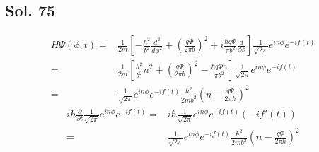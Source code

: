  \subsection*{Sol. 75}
 \begin{align*}
     H\Psi(\phi,t)
    =& \frac{1}{2m}
    \left[
    -\frac{\hbar^2}{b^2}\frac{d^2}{d\phi^2}
    +\left(
    \frac{q\Phi}{2\pi b}
    \right)^2
    +
    i\frac{\hbar q\Phi}{\pi b^2}
    \frac{d}{d\phi}
    \right]
    \frac{1}{\sqrt{2\pi}}
    e^{in\phi}
    e^{-if(t)}\\
    =&\frac{1}{2m}
    \left[
    \frac{\hbar^2}{b^2}n^2
    +\left(
    \frac{q\Phi}{2\pi b}
    \right)^2
    -
    \frac{\hbar q\Phi n}{\pi b^2}
    \right]
    \frac{1}{\sqrt{2\pi}}
    e^{in\phi}
    e^{-if(t)}\\
    =&\frac{1}{\sqrt{2\pi}}
     e^{in\phi}
     e^{-if(t)}
     \frac{\hbar^2}{2mb^2}
     \left(
    n- \frac{q\Phi}{2\pi\hbar}
     \right)^2
 \end{align*}
 \begin{align*}
     i\hbar\frac{\partial}{\partial t}
     \frac{1}{\sqrt{2\pi}}
     e^{in\phi}
     e^{-if(t)}
     =& 
     i\hbar
     \frac{1}{\sqrt{2\pi}}
     e^{in\phi}
     e^{-if(t)}
     (-if'(t))\\
     =&
     \frac{1}{\sqrt{2\pi}}
     e^{in\phi}
     e^{-if(t)}
     \frac{\hbar^2}{2mb^2}
     \left(
    n- \frac{q\Phi}{2\pi\hbar}
     \right)^2
 \end{align*}

